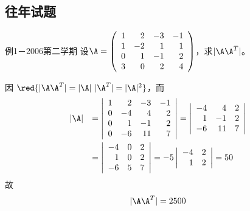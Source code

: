 \subsection{往年试题}



\begin{frame}
  \begin{footnotesize}
    \begin{exampleblock}{例1－2006第二学期}
      设$\A=\left(
      \begin{array}{rrrr}
        1&2&-3&-1\\
        1&-2&1&1\\
        0&1&-1&2\\
        3&0&2&4
      \end{array}
      \right)$，求$|\A\A^T|$。
    \end{exampleblock}
    \pause\jiename
    因
    $\red{
    |\A\A^T|=|\A|~|\A^T|=|\A|^2}
    $，而
    $$
    \begin{array}{rl}
      |\A|&=\left|
      \begin{array}{rrrr}
        1&2&-3&-1\\
        0&-4&4&2\\
        0&1&-1&2\\
        0&-6&11&7
      \end{array}
      \right|=\left|
      \begin{array}{rrr}
        -4&4&2\\
        1&-1&2\\
        -6&11&7
      \end{array}
      \right|\\[0.3in]
      &=\left|
      \begin{array}{rrr}
        -4&0&2\\
        1&0&2\\
        -6&5&7
      \end{array}
      \right|=-5\left|
      \begin{array}{rrr}
        -4&2\\
        1&2\\
      \end{array}
      \right|=50
    \end{array}
    $$
    故$$|\A\A^T|=2500$$
  \end{footnotesize}
\end{frame}


